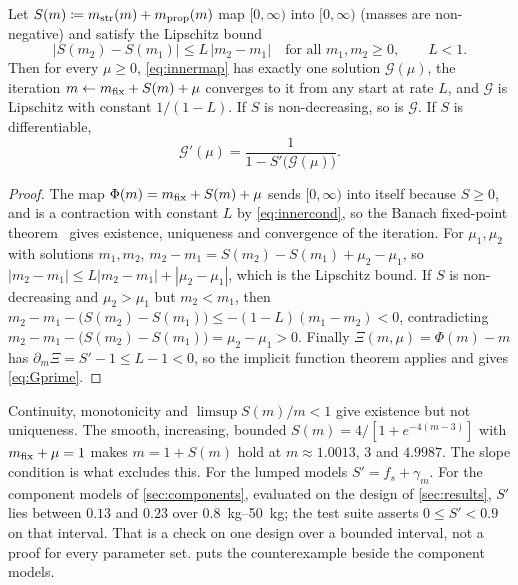 \begin{proposition}
\label{prop:inner}
Let $S(m)\coloneqq m_{\mathrm{str}}(m)+m_{\mathrm{prop}}(m)$ map $[0,\infty)$ into $[0,\infty)$ (masses
are non-negative) and satisfy the Lipschitz bound
\begin{equation}
  |S(m_2)-S(m_1)| \le L\,|m_2-m_1|
  \quad\text{for all } m_1,m_2\ge0,
  \qquad L<1 .
  \label{eq:innercond}
\end{equation}
Then for every $\mu\ge0$, \cref{eq:innermap} has exactly one solution
$\mathcal{G}(\mu)$, the iteration $m\leftarrow m_{\mathrm{fix}}+S(m)+\mu$ converges to it
from any start at rate $L$, and $\mathcal{G}$ is Lipschitz with constant
$1/(1-L)$. If $S$ is non-decreasing, so is $\mathcal{G}$. If $S$ is
differentiable,
\begin{equation}
  \mathcal{G}'(\mu) = \frac{1}{1-S'\big(\mathcal{G}(\mu)\big)} .
  \label{eq:Gprime}
\end{equation}
\end{proposition}

\begin{proof}
The map $\Phi(m)=m_{\mathrm{fix}}+S(m)+\mu$ sends $[0,\infty)$ into itself because
$S\ge0$, and is a contraction with constant $L$ by \cref{eq:innercond}, so the
Banach fixed-point
theorem~\cite[Ch.~5]{ortega1970} gives existence, uniqueness and convergence of
the iteration. For $\mu_1,\mu_2$ with solutions $m_1,m_2$,
$m_2-m_1 = S(m_2)-S(m_1)+\mu_2-\mu_1$, so
$|m_2-m_1|\le L|m_2-m_1|+|\mu_2-\mu_1|$, which is the Lipschitz bound. If $S$ is
non-decreasing and $\mu_2>\mu_1$ but $m_2<m_1$, then
$m_2-m_1-\big(S(m_2)-S(m_1)\big)\le-(1-L)(m_1-m_2)<0$, contradicting
$m_2-m_1-\big(S(m_2)-S(m_1)\big)=\mu_2-\mu_1>0$. Finally
$\Xi(m,\mu)=\Phi(m)-m$ has $\partial_m\Xi = S'-1\le L-1<0$, so the implicit
function theorem applies and gives \cref{eq:Gprime}.
\end{proof}

\begin{remark}
Continuity, monotonicity and $\limsup S(m)/m<1$ give existence but not
uniqueness. The smooth, increasing, bounded
$S(m)=4/[1+e^{-4(m-3)}]$ with $m_{\mathrm{fix}}+\mu=1$ makes $m=1+S(m)$ hold at
$m\approx1.0013$, $3$ and $4.9987$. The slope condition is what excludes this.
For the lumped models $S'=f_s+\gamma_m$. For the component models of
\cref{sec:components}, evaluated on the design of \cref{sec:results}, $S'$ lies
between $0.13$ and $0.23$ over \SIrange{0.8}{50}{\kilo\gram}; the test suite
asserts $0\le S'<0.9$ on that interval. That is a check on one design over a
bounded interval, not a proof for every parameter set. 
puts the counterexample beside the component models.
\end{remark}

